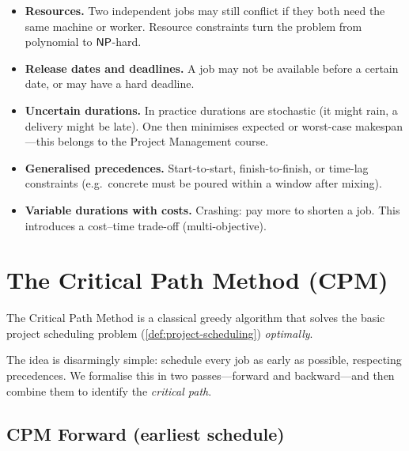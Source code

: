 \begin{itemize}[nosep]
  \item \textbf{Resources.}
    Two independent jobs may still conflict if they both need the
    same machine or worker.
    Resource constraints turn the problem from polynomial to
    $\mathsf{NP}$-hard.
  \item \textbf{Release dates and deadlines.}
    A job may not be available before a certain date, or may have
    a hard deadline.
  \item \textbf{Uncertain durations.}
    In practice durations are stochastic (it might rain, a
    delivery might be late).
    One then minimises expected or worst-case makespan---this
    belongs to the Project Management course.
  \item \textbf{Generalised precedences.}
    Start-to-start, finish-to-finish, or time-lag constraints
    (e.g.\ concrete must be poured within a window after mixing).
  \item \textbf{Variable durations with costs.}
    Crashing: pay more to shorten a job.  This introduces a
    cost--time trade-off (multi-objective).
\end{itemize}


\section{The Critical Path Method (CPM)}
\label{sec:cpm}

The Critical Path Method is a classical greedy algorithm that
solves the basic project scheduling problem
(\cref{def:project-scheduling}) \emph{optimally}.%

The idea is disarmingly simple: schedule every job as early as
possible, respecting precedences.  We formalise this in two
passes---forward and backward---and then combine them to identify
the \emph{critical path}.

\subsection{CPM Forward (earliest schedule)}
\label{ssec:cpm-forward}

